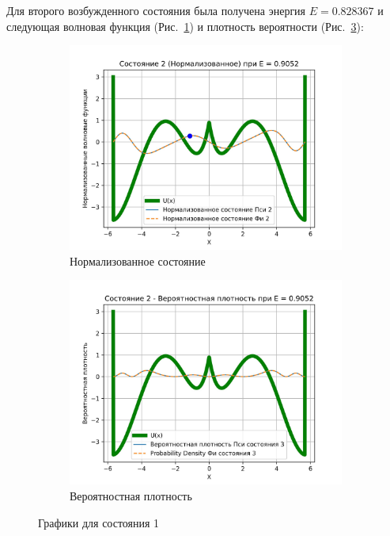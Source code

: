 \documentclass[a4paper,12pt]{article}
\begin{document}
Для второго возбужденного состояния была получена энергия $E = 0.828367$ и следующая волновая функция (Рис.~\ref{fig:norm2}) и плотность вероятности (Рис.~\ref{fig:probDens2}):

\begin{figure}[H]
    \centering
    \begin{subfigure}{0.45\textwidth}
        \centering
        \includegraphics[width=0.9\linewidth]{Condition_2_(normalized)}
        \caption{Нормализованное состояние}
        \label{fig:norm2}
    \end{subfigure}%
    \begin{subfigure}{0.45\textwidth}
        \centering
        \includegraphics[width=0.9\linewidth]{Condition_2_(Probability_density)}
        \caption{Вероятностная плотность}
        \label{fig:probDens2}
    \end{subfigure}%
\caption{Графики для состояния 1}
\end{figure}
\label{fig:cond2}
\end{document}
